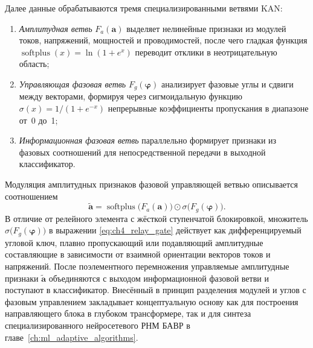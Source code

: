 Далее данные обрабатываются тремя специализированными ветвями KAN:
\begin{enumerate}
    \item \textit{Амплитудная ветвь} $F_a(\boldsymbol{a})$ выделяет
    нелинейные признаки из модулей токов, напряжений, мощностей и
    проводимостей, после чего гладкая функция
    $\operatorname{softplus}(x)=\ln(1+e^x)$ переводит отклики в
    неотрицательную область;
    \item \textit{Управляющая фазовая ветвь} $F_g(\boldsymbol{\varphi})$
    анализирует фазовые углы и сдвиги между векторами, формируя через
    сигмоидальную функцию $\sigma(x)=1/(1+e^{-x})$ непрерывные
    коэффициенты пропускания в диапазоне от~0 до~1;
    \item \textit{Информационная фазовая ветвь} параллельно формирует
    признаки из фазовых соотношений для непосредственной передачи в
    выходной классификатор.
\end{enumerate}

Модуляция амплитудных признаков фазовой управляющей ветвью описывается
соотношением
\begin{equation}
    \widetilde{\boldsymbol{a}} =
    \operatorname{softplus}\bigl(F_a(\boldsymbol{a})\bigr)
    \odot \sigma\bigl(F_g(\boldsymbol{\varphi})\bigr).
    \label{eq:ch4_relay_gate}
\end{equation}
В отличие от релейного элемента с жёсткой ступенчатой блокировкой,
множитель $\sigma\bigl(F_g(\boldsymbol{\varphi})\bigr)$ в выражении
\eqref{eq:ch4_relay_gate} действует как дифференцируемый угловой ключ,
плавно пропускающий или подавляющий амплитудные составляющие в
зависимости от взаимной ориентации векторов токов и напряжений. После
поэлементного перемножения управляемые амплитудные признаки
$\widetilde{\boldsymbol{a}}$ объединяются с выходом информационной
фазовой ветви и поступают в классификатор. Внесённый в 
принцип разделения модулей и углов с фазовым управлением закладывает
концептуальную основу как для построения направляющего блока в глубоком
трансформере, так и для синтеза специализированного нейросетевого РНМ
БАВР в главе~\ref{ch:ml_adaptive_algorithms}.

